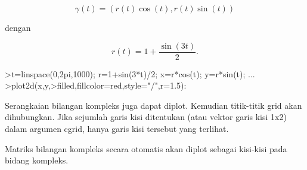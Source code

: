 \documentclass[a4paper,10pt]{article}
\begin{document}
\begin{eulernotebook}
\begin{eulercomment}
\begin{eulercomment}
\begin{eulercomment}
\begin{eulercomment}
\begin{eulercomment}
\begin{eulercomment}
\begin{eulercomment}
\begin{eulercomment}
\begin{eulercomment}
\begin{eulercomment}
\begin{eulercomment}
\begin{eulercomment}
\begin{eulercomment}
\begin{eulercomment}
\begin{eulercomment}
\begin{eulercomment}
\begin{eulercomment}
\begin{eulercomment}
\begin{eulercomment}
\begin{eulercomment}
\begin{eulercomment}
\begin{eulercomment}
\begin{eulercomment}
\begin{eulercomment}
\begin{eulercomment}
\begin{eulercomment}
\begin{eulercomment}
\begin{eulercomment}
\begin{eulercomment}
\begin{eulercomment}
\begin{eulercomment}
\begin{eulercomment}
\begin{eulercomment}
\begin{eulercomment}
\begin{eulercomment}
\begin{eulercomment}
\begin{eulercomment}
\end{eulercomment}
\begin{eulerformula}
\[
\gamma(t) = (r(t) \cos(t), r(t) \sin(t))
\]
\end{eulerformula}
\begin{eulercomment}
dengan

\end{eulercomment}
\begin{eulerformula}
\[
r(t) = 1 + \dfrac{\sin(3t)}{2}.
\]
\end{eulerformula}
\begin{eulerprompt}
>t=linspace(0,2pi,1000); r=1+sin(3*t)/2; x=r*cos(t); y=r*sin(t); ...
>plot2d(x,y,>filled,fillcolor=red,style="/",r=1.5):
\end{eulerprompt}
\begin{eulercomment}
Serangkaian bilangan kompleks juga dapat diplot. Kemudian titik-titik
grid akan dihubungkan. Jika sejumlah garis kisi ditentukan (atau
vektor garis kisi 1x2) dalam argumen cgrid, hanya garis kisi tersebut
yang terlihat.

Matriks bilangan kompleks secara otomatis akan diplot sebagai
kisi-kisi pada bidang kompleks.


\end{eulercomment}
\end{eulercomment}
\end{eulercomment}
\end{eulercomment}
\end{eulercomment}
\end{eulercomment}
\end{eulercomment}
\end{eulercomment}
\end{eulercomment}
\end{eulercomment}
\end{eulercomment}
\end{eulercomment}
\end{eulercomment}
\end{eulercomment}
\end{eulercomment}
\end{eulercomment}
\end{eulercomment}
\end{eulercomment}
\end{eulercomment}
\end{eulercomment}
\end{eulercomment}
\end{eulercomment}
\end{eulercomment}
\end{eulercomment}
\end{eulercomment}
\end{eulercomment}
\end{eulercomment}
\end{eulercomment}
\end{eulercomment}
\end{eulercomment}
\end{eulercomment}
\end{eulercomment}
\end{eulercomment}
\end{eulercomment}
\end{eulercomment}
\end{eulercomment}
\end{eulercomment}
\end{eulernotebook}
\end{document}

